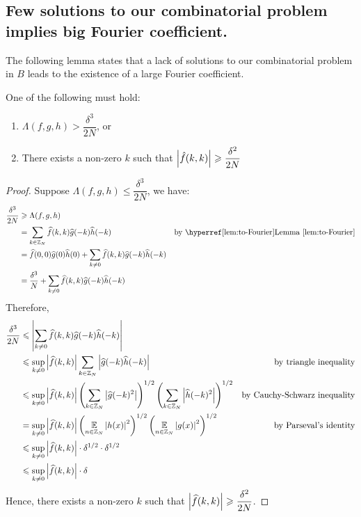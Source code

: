 \subsection{Few solutions to our combinatorial problem implies big Fourier coefficient.} The following lemma states that a lack of solutions to our combinatorial problem in $ B $ leads to the existence of a large Fourier coefficient.  
\begin{lemma} \label{lem:big-Fourier}
	One of the following must hold:
	\begin{enumerate}
		\item $ \Lambda(f,g,h) > \dfrac{\delta^3}{2N}$, or
		\item There exists a non-zero $ k $ such that $ \left\vert{\hat{f}(k,k)}\right\vert \geqslant \dfrac{\delta^2}{2N} $
	\end{enumerate}
\end{lemma}

\begin{proof}
	Suppose  $ \Lambda(f,g,h) \leq \dfrac{\delta^3}{2N}$, we have:
	\begin{align*}
		\dfrac{\delta^3}{2N} & \geq \Lambda(f,g,h) \\
		& = \sum\limits_{k \in \bbZ_N} \widehat{f}(k,k) \widehat{g}(-k) \widehat{h}(-k)  & \text{by \lemmaref{to-Fourier}} \\
		& = \widehat{f}(0,0) \widehat{g}(0) \widehat{h}(0) + \sum\limits_{k \neq 0} \widehat{f}(k,k) \widehat{g}(-k) \widehat{h}(-k) \\
		& = \dfrac{\delta^3}{N} + \sum\limits_{k \neq 0} \widehat{f}(k,k) \widehat{g}(-k) \widehat{h}(-k) \\
	\end{align*}
	Therefore, 
	\begin{align*}
		\dfrac{\delta^3}{2N} 
		& \leqslant \left\vert{\sum\limits_{k \neq 0} \widehat{f}(k,k) \widehat{g}(-k) \widehat{h}(-k)}\right\vert \\
		& \leqslant \sup_{k \neq 0} \left\vert{\widehat{f}(k, k)}\right\vert \sum\limits_{k \in {\mathbb Z}_N}  \left\vert{\widehat{g}(-k) \widehat{h}(-k)}\right\vert & \text{by triangle inequality} \\
		& \leqslant \sup_{k \neq 0} \left\vert{\widehat{f}(k, k)}\right\vert \left(\sum\limits_{k \in {\mathbb Z}_N} \left\vert{\widehat{g}(-k)^2}\right\vert\right)^{1/2} \left(\sum\limits_{k \in {\mathbb Z}_N} \left\vert{\widehat{h}(-k)^2}\right\vert\right)^{1/2} & \text{by Cauchy-Schwarz inequality} \\
		& = \sup_{k \neq 0} \left\vert{\widehat{f}(k, k)}\right\vert \left(\underset{n \in {\mathbb Z}_N} {{\mathbb E}} \left\vert{h(x)}\right\vert^2 \right)^{1/2} \left(\underset{n \in {\mathbb Z}_N} {{\mathbb E}} \left\vert{g(x)}\right\vert^2 \right)^{1/2}  & \text{by Parseval's identity}\\
		& \leqslant \sup_{k \neq 0} \left\vert{\widehat{f}(k, k)}\right\vert \cdot \delta^{1/2} \cdot \delta^{1/2} \\
		& \leqslant \sup_{k \neq 0} \left\vert{\widehat{f}(k, k)}\right\vert \cdot \delta  		
	\end{align*} 
Hence, there exists a non-zero $ k $ such that $ \left\vert{\widehat{f}(k, k)}\right\vert \geqslant \dfrac{\delta^2}{2N} $.
\end{proof}

